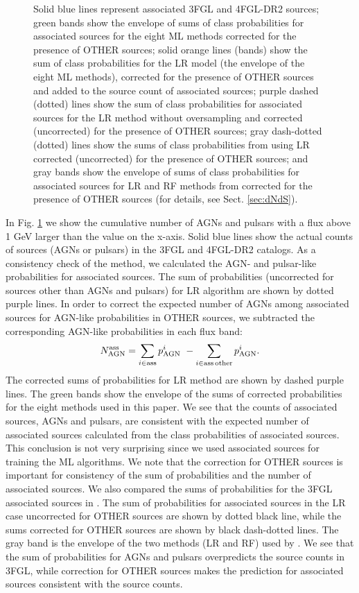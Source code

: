 \documentclass[referee]{aa} %
\newcommand{\bea}{\begin{eqnarray}}
\newcommand{\eea}{\end{eqnarray}}
\newcommand{\lb}{\label}
\begin{document}
\begin{figure}[h]
{Solid blue lines represent associated 3FGL and 4FGL-DR2  sources; green bands show the envelope of sums of class probabilities for associated sources for the eight ML methods corrected for the presence of OTHER sources; solid orange lines (bands) show the sum of class probabilities for the LR model (the envelope of the eight ML methods), corrected for the presence of OTHER sources and added to the source count of associated sources; purple dashed (dotted) lines show the sum of class probabilities for associated sources for the LR method without oversampling and corrected (uncorrected) for the presence of OTHER sources; gray dash-dotted (dotted) lines show the sums of class probabilities from \cite{2016ApJ...820....8S} using LR corrected (uncorrected) for the presence of OTHER sources; and gray bands show the envelope of sums of class probabilities for associated sources for LR and RF methods from \cite{2016ApJ...820....8S} corrected for the presence of OTHER sources (for details, see Sect. \ref{sec:dNdS}).}  
\label{fig:logN_logS}
\end{figure}




In Fig. \ref{fig:logN_logS} we show the cumulative number of AGNs and pulsars with a flux above 1 GeV larger than the
value on the x-axis.
Solid blue lines show the actual counts of sources (AGNs or pulsars) in the 3FGL and 4FGL-DR2 catalogs.
As a consistency check of the method, we calculated the AGN- and pulsar-like probabilities for associated sources.
The sum of probabilities (uncorrected for sources other than AGNs and pulsars) for LR algorithm are shown by dotted purple lines.
In order to correct the expected number of AGNs among associated sources for AGN-like probabilities in OTHER sources, 
we subtracted the corresponding AGN-like probabilities in each flux band:
\bea
\lb{eq:assoc_ev}
N_{\rm AGN}^{\rm ass}  = \sum_{i \in \rm ass} p^i_{\rm AGN}\,\, - \sum_{i \in \rm ass\,other} p^i_{\rm AGN}.
\eea
The corrected sums of probabilities for LR method are shown by dashed purple lines.
The green bands show the envelope of the sums of corrected probabilities for the eight methods used in this paper.
We see that the counts of associated sources, AGNs and pulsars, are consistent with the expected number of associated sources
calculated from the class probabilities of associated sources.
This conclusion is not very surprising since we used associated sources for training the ML algorithms.
We note that the correction for OTHER sources is important for consistency of the sum of probabilities and the number of associated sources.
We also compared the sums of probabilities for the 3FGL associated sources in \cite{2016ApJ...820....8S}.
The sum of probabilities for associated sources in the LR case uncorrected for OTHER sources are shown by dotted black line,
while the sums corrected for OTHER sources are shown by black dash-dotted lines.
The gray band is the envelope of the two methods (LR and RF) used by \cite{2016ApJ...820....8S}.
We see that the sum of probabilities for AGNs and pulsars overpredicts the source counts in 3FGL, 
while correction for OTHER sources makes the prediction for associated sources consistent with the source counts.
\end{document}
